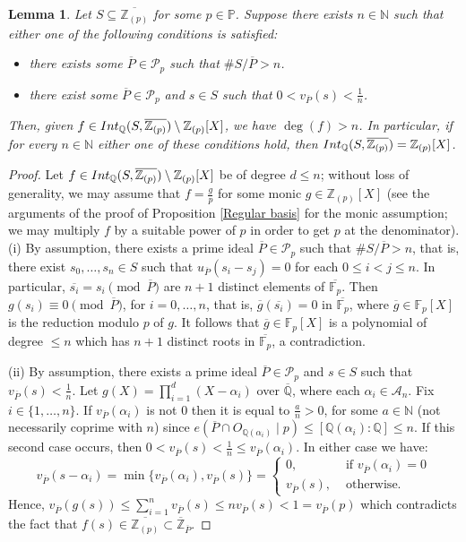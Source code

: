 \documentclass{article}
\newtheorem{Lem}[equation]{Lemma}
\theoremstyle{definition}\newtheorem{Def}[equation]{Definition}
\theoremstyle{definition}\newtheorem{Ques}[equation]{Question}
\theoremstyle{definition}\newtheorem{Conj}[equation]{Conjecture}
\theoremstyle{definition}\newtheorem{Not}[equation]{Notation}
\newcommand{\N}{\mathbb{N}}
\newcommand{\Q}{\mathbb{Q}}
\newcommand{\F}{\mathbb{F}}
\newcommand{\oQ}{\overline{\Q}}
\newcommand{\oZ}{\overline{\Z}}
\newcommand{\oP}{\overline{P}}
\newcommand{\Z}{\mathbb{Z}}
\newcommand{\Int}{\textnormal{Int}}
\newcommand{\IntQ}{\Int_{\Q}}
\newcommand{\An}{\mathcal{A}_n}
\newcommand{\PP}{\mathbb{P}}
\numberwithin{equation}{section}
\begin{document}
\begin{Lem}\label{Unbounded res field deg lem}
Let  $S\subseteq\overline{\Z_{(p)}}$ for some  $p\in\PP$. Suppose there exists $n\in\N$ such that either one of the following conditions is satisfied:
\begin{itemize}
    \item[(i)] there exists some $\oP\in\mathcal{P}_p$ such that $\# S/\oP>n$.
    \item[(ii)] there exist some $\oP\in\mathcal{P}_p$ and $s\in S$ such that $0<v_{\oP}(s)<\frac{1}{n}$.
\end{itemize}
Then, given $f\in\IntQ(S,\overline{\Z_{(p)}})\setminus\Z_{(p)}[X]$, we have $\deg(f)>n$. In particular, if for every $n\in\N$ either one of these conditions hold, then $\IntQ(S,\overline{\Z_{(p)}})=\Z_{(p)}[X]$.
\end{Lem}
\begin{proof}
Let $f\in\IntQ(S,\overline{\Z_{(p)}})\setminus\Z_{(p)}[X]$ be of degree $d\leq n$; without loss of generality, we may assume that $f=\frac{g}{p}$ for some monic $g\in\Z_{(p)}[X]$ (see the arguments of the proof of Proposition \ref{Regular basis} for the monic assumption; we may multiply $f$ by a suitable power of $p$ in order to get $p$ at the denominator). 
\vskip0.2cm
(i)   By assumption, there exists a prime ideal $\oP\in\mathcal P_p$ such that $\#S/\oP>n$, that is, there exist $s_0,\ldots,s_n\in S$ such that $u_{\oP}(s_i-s_j)=0$ for each $0\leq i<j\leq n$. In particular, $\overline{s_i}=s_i\pmod{\oP}$ are $n+1$ distinct elements of $\overline{\F_p}$. Then $g(s_i)\equiv0\pmod \oP$, for $i=0,\ldots,n$, that is, $\overline{g}(\overline{s_i})=0$ in $\overline{\F_p}$, where $\overline{g}\in\F_p[X]$ is the reduction modulo $p$ of $g$. It follows that  $\overline{g}\in\F_p[X]$ is a polynomial of degree $\leq n$ which has $n+1$ distinct roots in $\overline{\F_p}$, a contradiction.
   
\vskip0.3cm
(ii) By assumption, there exists a prime ideal $\oP\in\mathcal{P}_p$ and $s\in S$ such that $v_{\oP}(s)<\frac{1}{n}$. Let  $g(X)=\prod_{i=1}^d(X-\alpha_i)$ over $\oQ$, where each $\alpha_i \in \An$. Fix $i\in\{1,\ldots,n\}$. If $v_{\oP}(\alpha_i)$ is not $0$ then it is equal to $\frac{a}{n}>0$, for some $a\in\N$ (not necessarily coprime with $n$) since $e(\oP\cap O_{\Q(\alpha_i)}\mid p)\leq [\Q(\alpha_i):\Q]\leq n$. If this second case occurs, then $0<v_{\oP}(s)<\frac{1}{n}\leq v_{\oP}(\alpha_i)$. In either case we have:
$$v_{\oP}(s-\alpha_i)=\min\{v_{\oP}(\alpha_i),v_{\oP}(s)\}=
\begin{cases}
0,&\text{ if }v_{\oP}(\alpha_i)=0\\
v_{\oP}(s),&\text{ otherwise}.
\end{cases}$$
Hence, $v_{\oP}(g(s))\leq \sum_{i=1}^n v_{\oP}(s)\leq nv_{\oP}(s)<1=v_{\oP}(p)$ which contradicts the fact that $f(s)\in\overline{\Z_{(p)}}\subset\oZ_{\oP}$.
\end{proof}
\end{document}
